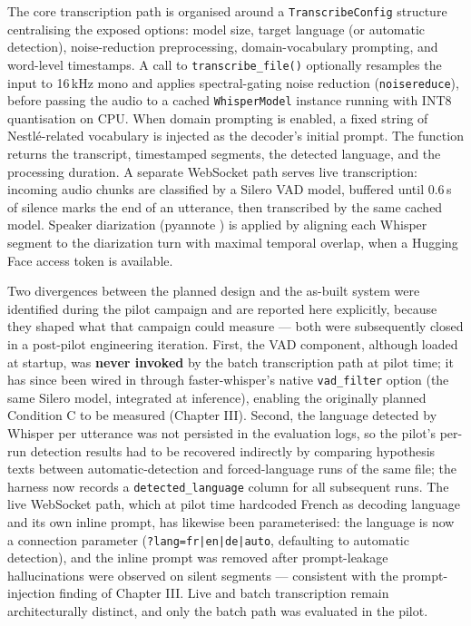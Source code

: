 \documentclass[12pt]{report}
\begin{document}
The core transcription path is organised around a \texttt{TranscribeConfig} structure centralising the exposed options: model size, target language (or automatic detection), noise-reduction preprocessing, domain-vocabulary prompting, and word-level timestamps. A call to \texttt{transcribe\_file()} optionally resamples the input to 16\,kHz mono and applies spectral-gating noise reduction (\texttt{noisereduce}), before passing the audio to a cached \texttt{WhisperModel} instance running with INT8 quantisation on CPU. When domain prompting is enabled, a fixed string of Nestl\'e-related vocabulary is injected as the decoder's initial prompt. The function returns the transcript, timestamped segments, the detected language, and the processing duration. A separate WebSocket path serves live transcription: incoming audio chunks are classified by a Silero VAD model, buffered until 0.6\,s of silence marks the end of an utterance, then transcribed by the same cached model. Speaker diarization (pyannote \cite{bredin2020pyannote}) is applied by aligning each Whisper segment to the diarization turn with maximal temporal overlap, when a Hugging Face access token is available.

Two divergences between the planned design and the as-built system were identified during the pilot campaign and are reported here explicitly, because they shaped what that campaign could measure --- both were subsequently closed in a post-pilot engineering iteration. First, the VAD component, although loaded at startup, was \textbf{never invoked} by the batch transcription path at pilot time; it has since been wired in through faster-whisper's native \texttt{vad\_filter} option (the same Silero model, integrated at inference), enabling the originally planned Condition C to be measured (Chapter III). Second, the language detected by Whisper per utterance was not persisted in the evaluation logs, so the pilot's per-run detection results had to be recovered indirectly by comparing hypothesis texts between automatic-detection and forced-language runs of the same file; the harness now records a \texttt{detected\_language} column for all subsequent runs. The live WebSocket path, which at pilot time hardcoded French as decoding language and its own inline prompt, has likewise been parameterised: the language is now a connection parameter (\texttt{?lang=fr|en|de|auto}, defaulting to automatic detection), and the inline prompt was removed after prompt-leakage hallucinations were observed on silent segments --- consistent with the prompt-injection finding of Chapter III. Live and batch transcription remain architecturally distinct, and only the batch path was evaluated in the pilot.
\end{document}
